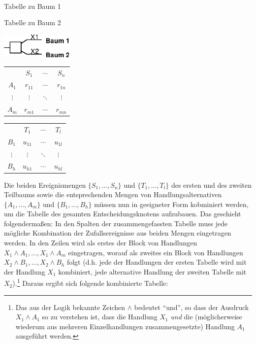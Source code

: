 \begin{small}
\parbox{3.5cm}{\ }
\parbox{4.5cm}{\begin{center}Tabelle zu Baum 1\end{center}}
\parbox{4.5cm}{\begin{center}Tabelle zu Baum 2\end{center}}

\parbox{3.5cm}{\includegraphics[width=3.5cm]{Grafiken/Beispiel1b_3.eps}}
\parbox{4.5cm}{
\begin{tabular}{c|ccc|}
         & $S_1$    & $\cdots$ & $S_n$     \\ \cline{1-4}
$A_1$    & $r_{11}$ & $\cdots$ & $r_{1n}$  \\ %
$\vdots$ & $\vdots$ & $\ddots$ & $\vdots$  \\ %
$A_m$    & $r_{m1}$ & $\cdots$ & $r_{mn}$  \\ \cline{1-4}
\end{tabular}}
\parbox{4.5cm}{
\begin{tabular}{c|ccc|}
         & $T_1$    & $\cdots$ & $T_l$     \\ \cline{1-4}
$B_1$    & $u_{11}$ & $\cdots$ & $u_{1l}$  \\ %
$\vdots$ & $\vdots$ & $\ddots$ & $\vdots$  \\ %
$B_h$    & $u_{h1}$ & $\cdots$ & $u_{hl}$  \\ \cline{1-4}
\end{tabular}}
\end{small}

\vspace{0.5cm}

Die beiden Ereignismengen $\{S_1, \ldots, S_n\}$ und $\{T_1, \ldots, T_l\}$ des
ersten und des zweiten Teilbaums sowie die entsprechenden Mengen von
Handlungsalternativen $\{A_1, \ldots, A_m\}$ und $\{B_1, \ldots, B_h\}$ müssen
nun in geeigneter Form kobminiert werden, um die Tabelle des gesamten
Entscheidungsknotens aufzubauen. Das geschieht folgendermaßen: In den Spalten
der zusammengefassten Tabelle muss jede mögliche Kombination der
Zufallsereignisse aus beiden Mengen eingetragen werden. In den Zeilen wird als
erstes der Block von Handlungen $X_1 \wedge A_1,\ldots, X_1 \wedge A_m$
eingetragen, worauf als zweites ein Block von Handlungen $X_2 \wedge
B_1,\ldots, X_2 \wedge B_h$ folgt (d.h. jede der Handlungen der ersten Tabelle
wird mit der Handlung $X_1$ kombiniert, jede alternative Handlung der zweiten
Tabelle mit $X_2$).\footnote{Das aus der Logik bekannte Zeichen $\wedge$
bedeutet "`und"', so dass der Ausdruck $X_1 \wedge A_1$ so zu verstehen ist,
dass die Handlung $X_1$ {\em und} die (möglicherweise wiederum aus mehreren
Einzelhandlungen zusammengesetzte) Handlung $A_1$ ausgeführt werden.} Daraus
ergibt sich folgende kombinierte Tabelle:


